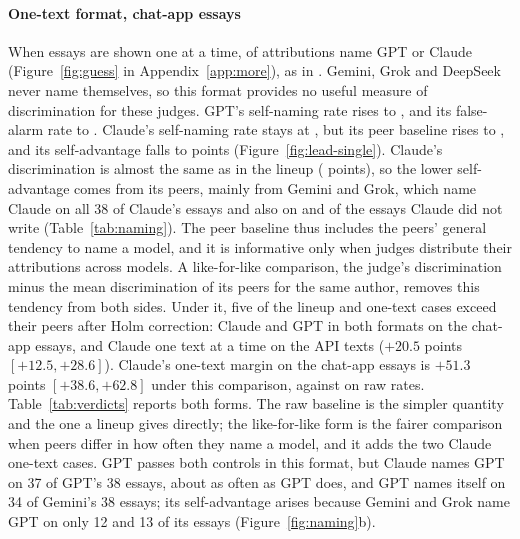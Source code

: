 \paragraph{One-text format, chat-app essays}
When essays are shown one at a time, \SingleConcentration{} of attributions name
GPT or Claude (Figure~\ref{fig:guess} in Appendix~\ref{app:more}), as in \citet{bai2025selfrecognition}.
Gemini, Grok and DeepSeek never name themselves, so this format provides no
useful measure of discrimination for these judges. GPT's self-naming rate
rises to \GPTSelfSingle{}, and its false-alarm rate to \GPTFASingle{}. Claude's
self-naming rate stays at \ClaudeSelfSingle{}, but its peer baseline rises to
\ClaudePeerSingle{}, and its self-advantage falls to \ClaudeAdvSingle{} points
(Figure~\ref{fig:lead-single}). Claude's discrimination is almost the same as
in the lineup (\CXClaudeChatSingleDisc{} points), so the lower self-advantage
comes from its peers, mainly from Gemini and Grok, which name Claude on all 38 of Claude's
essays and also on \CRGeminiOnClaudeSingleFA{} and \CRGrokOnClaudeSingleFA{} of
the essays Claude did not write (Table~\ref{tab:naming}). The peer baseline
thus includes the peers' general tendency to name a model, and it is
informative only when judges distribute their attributions across models.
A like-for-like comparison, the judge's discrimination minus the mean
discrimination of its peers for the same author, removes this tendency from
both sides. Under it, five of the \CVattr{} lineup and one-text cases exceed
their peers after Holm correction: Claude and GPT in both formats on the
chat-app essays, and Claude one text at a time on the API texts ($+20.5$
points $[+12.5, +28.6]$). Claude's one-text margin on the chat-app essays is
$+51.3$ points $[+38.6, +62.8]$ under this comparison, against
\ClaudeAdvSingle{} on raw rates. Table~\ref{tab:verdicts} reports both forms.
The raw baseline is the simpler quantity and the one a lineup gives directly;
the like-for-like form is the fairer comparison when peers differ in how often
they name a model, and it adds the two Claude one-text cases. GPT
passes both controls in this format, but Claude names GPT on 37 of GPT's 38
essays, about as often as GPT does, and GPT names itself on 34 of Gemini's 38
essays; its self-advantage arises because Gemini and Grok name GPT on only 12
and 13 of its essays (Figure~\ref{fig:naming}b).

